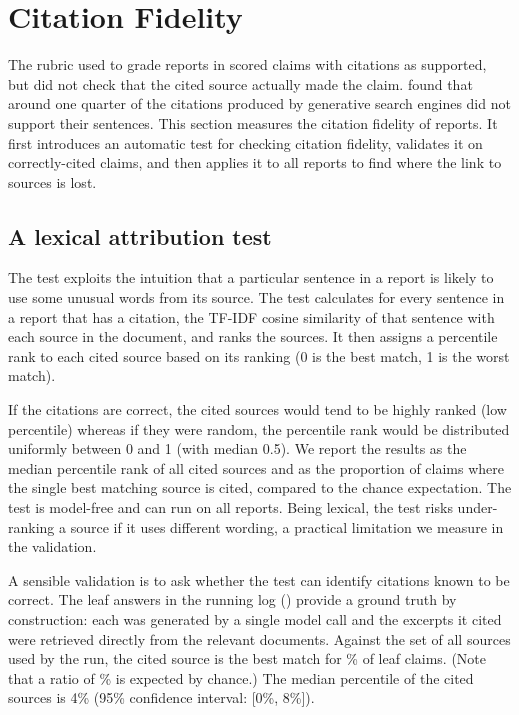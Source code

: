 \section{Citation Fidelity}
\label{sec:citations}

The rubric used to grade \sys{} reports in  scored claims with citations as supported, but did not check that the cited source actually made the claim. \citet{liu2023verifiability} found that around one quarter of the citations produced by generative search engines did not support their sentences. This section measures the citation fidelity of \sys{} reports. It first introduces an automatic test for checking citation fidelity, validates it on correctly-cited claims, and then applies it to all \sys{} reports to find where the link to sources is lost.

\subsection{A lexical attribution test}
The test exploits the intuition that a particular sentence in a report is likely to use some unusual words from its source. The test calculates for every sentence in a report that has a citation, the TF-IDF cosine similarity \citep{salton1988termweighting} of that sentence with each source in the document, and ranks the sources. It then assigns a percentile rank to each cited source based on its ranking (0 is the best match, 1 is the worst match).

If the citations are correct, the cited sources would tend to be highly ranked (low percentile) whereas if they were random, the percentile rank would be distributed uniformly between 0 and 1 (with median 0.5). We report the results as the median percentile rank of all cited sources and as the proportion of claims where the single best matching source is cited, compared to the chance expectation. The test is model-free and can run on all reports. Being lexical, the test risks under-ranking a source if it uses different wording, a practical limitation we measure in the validation.

A sensible validation is to ask whether the test can identify citations known to be correct. The leaf answers in the running log () provide a ground truth by construction: each was generated by a single model call and the excerpts it cited were retrieved directly from the relevant documents. Against the set of all \atValMeanCandidates{} sources used by the run, the cited source is the best match for \atValBestCitedPct\% of leaf claims. (Note that a ratio of \atValBestChancePct\% is expected by chance.) The median percentile of the cited sources is 4\% (95\% confidence interval: [0\%, 8\%]).

